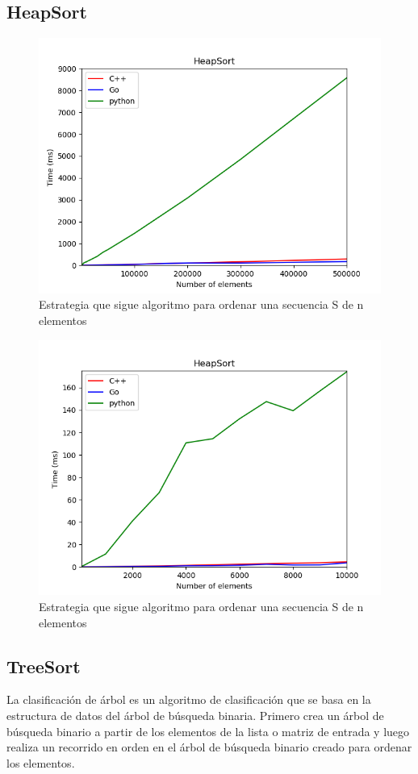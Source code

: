 \documentclass{article}
\begin{document}
    \subsection{HeapSort}
            \begin{figure}[h!]
            \centering
            \includegraphics[width=12cm]{img/HeapSort_1.png}
            \caption{Estrategia que sigue algoritmo para ordenar una secuencia S de n elementos}
            \label{fig:mergesort}
        \end {figure}
                \begin{figure}[h!]
            \centering
            \includegraphics[width=12cm]{img/HeapSort_2.png}
            \caption{Estrategia que sigue algoritmo para ordenar una secuencia S de n elementos}
            \label{fig:mergesort}
        \end {figure}
    \subsection{TreeSort}
    La clasificación de árbol es un algoritmo de clasificación que se basa en la estructura de datos del árbol de búsqueda binaria. Primero crea un árbol de búsqueda binario a partir de los elementos de la lista o matriz de entrada y luego realiza un recorrido en orden en el árbol de búsqueda binario creado para ordenar los elementos.
\end{document}
